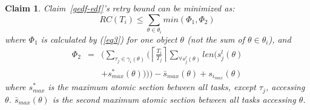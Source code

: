 \documentclass{sig-alternate}
\newtheorem{clm}{Claim}
\begin{document}
\begin{clm}
Claim~\ref{gedf-edf}'s retry bound can be minimized as:
\begin{equation}
RC(T_{i})\le \sum_{\theta\in\theta_{i}}min(\Phi_1 , \Phi_2)\label{eq5}\end{equation}
where $\Phi_1$ is calculated by (\ref{eq3}) for one object $\theta$ (not the sum of $\theta \in \theta_i$),  and 
\begin{eqnarray}
\Phi_2 & = & \Bigg(\sum_{\tau_{j}\in\gamma_i(\theta)} \Big(\left\lceil\frac{T_{i}}{T_{j}}\right\rceil\sum_{\forall s_{j}^{l}(\theta)}len \big(s_{j}^{l}(\theta)\nonumber \\
 &  & +s_{max}^{*}(\theta) \big) \Big) \Bigg)-\bar{s}_{max}(\theta)+s_{i_{max}}(\theta)\label{eq4}\end{eqnarray}
 where $s^*_{max}$ is the maximum atomic section between all tasks, except $\tau_j$, accessing $\theta$. $\bar{s}_{max}(\theta)$ is the second maximum atomic section between all tasks accessing $\theta$.
\end{clm}
\end{document}
